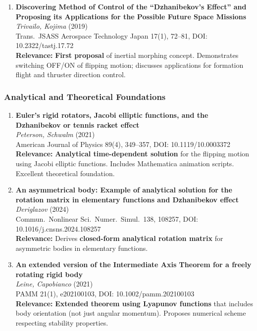 \documentclass[11pt]{article}
\begin{document}
\begin{enumerate}[label=\textbf{\arabic*.}]
    \item \textbf{Discovering Method of Control of the ``Dzhanibekov's Effect'' and Proposing its Applications for the Possible Future Space Missions}\\
    \textit{Trivailo, Kojima} (2019)\\
    Trans.\ JSASS Aerospace Technology Japan 17(1), 72--81, DOI: 10.2322/tastj.17.72\\
    \textbf{Relevance:} \textbf{First proposal} of inertial morphing concept. Demonstrates switching OFF/ON of flipping motion; discusses applications for formation flight and thruster direction control.
\end{enumerate}

\subsubsection{Analytical and Theoretical Foundations}

\begin{enumerate}[label=\textbf{\arabic*.},resume]
    \item \textbf{Euler's rigid rotators, Jacobi elliptic functions, and the Dzhanibekov or tennis racket effect}\\
    \textit{Peterson, Schwalm} (2021)\\
    American Journal of Physics 89(4), 349--357, DOI: 10.1119/10.0003372\\
    \textbf{Relevance:} \textbf{Analytical time-dependent solution} for the flipping motion using Jacobi elliptic functions. Includes Mathematica animation scripts. Excellent theoretical foundation.

    \item \textbf{An asymmetrical body: Example of analytical solution for the rotation matrix in elementary functions and Dzhanibekov effect}\\
    \textit{Deriglazov} (2024)\\
    Commun.\ Nonlinear Sci.\ Numer.\ Simul.\ 138, 108257, DOI: 10.1016/j.cnsns.2024.108257\\
    \textbf{Relevance:} Derives \textbf{closed-form analytical rotation matrix} for asymmetric bodies in elementary functions.

    \item \textbf{An extended version of the Intermediate Axis Theorem for a freely rotating rigid body}\\
    \textit{Leine, Capobianco} (2021)\\
    PAMM 21(1), e202100103, DOI: 10.1002/pamm.202100103\\
    \textbf{Relevance:} \textbf{Extended theorem using Lyapunov functions} that includes body orientation (not just angular momentum). Proposes numerical scheme respecting stability properties.
\end{enumerate}
\end{document}
